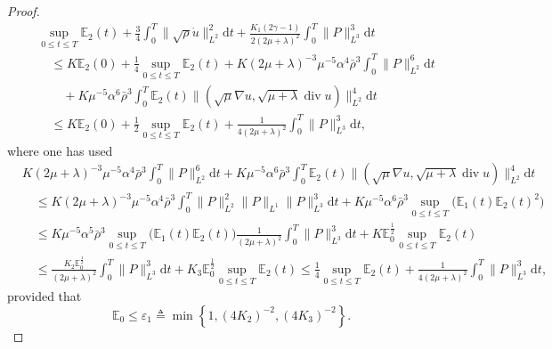 \documentclass[10pt,a4paper]{amsart}
\DeclareMathOperator{\divv}{div}
\begin{document}
\begin{proof}
\begin{align*}
& \sup_{0 \leq t \leq T} \mathbb{E}_2 (t) + \frac{3}{4}\int^T_0 \|\sqrt{\rho} \dot{u}\|_{L^2}^2 \mathrm{d} t + \frac{K_1 \left( 2 \gamma - 1\right)}{2 \left(2 \mu + \lambda \right)^2} \int^T_0 \|P\|_{L^3}^3 \mathrm{d} t\\
& \quad \leq K \mathbb{E}_2 (0) + \frac{1}{4} \sup_{0 \leq t \leq T} \mathbb{E}_2 (t) + K \left( 2 \mu + \lambda \right)^{-3} \mu^{-5} \alpha^4 \bar{\rho}^3 \int^T_0 \|P\|_{L^2}^6 \mathrm{d} t\\
& \qquad + K \mu^{-5} \alpha^6 \bar{\rho}^3 \int^T_0 \mathbb{E}_2 (t) \|(\sqrt{\mu}\nabla u, \sqrt{\mu + \lambda} \divv u)\|_{L^2}^4 \mathrm{d} t\\
& \quad \leq K \mathbb{E}_2 (0) + \frac{1}{2} \sup_{0 \leq t \leq T} \mathbb{E}_2 (t) + \frac{1}{4 \left(2 \mu + \lambda \right)^2} \int^T_0 \|P\|_{L^3}^3 \mathrm{d} t,
\end{align*}
where one has used
\begin{align*}
& K \left( 2 \mu + \lambda \right)^{-3} \mu^{-5} \alpha^4 \bar{\rho}^3 \int^T_0 \|P\|_{L^2}^6 \mathrm{d} t + K \mu^{-5} \alpha^6 \bar{\rho}^3 \int^T_0 \mathbb{E}_2 (t) \|(\sqrt{\mu}\nabla u, \sqrt{\mu + \lambda} \divv u)\|_{L^2}^4 \mathrm{d} t\\
& \quad \leq K \left( 2 \mu + \lambda \right)^{-3} \mu^{-5} \alpha^4 \bar{\rho}^3 \int^T_0 \|P\|_{L^2}^2 \|P\|_{L^1} \|P\|_{L^3}^3 \mathrm{d} t + K \mu^{-5} \alpha^6 \bar{\rho}^3 \sup_{0 \leq t \leq T}\big(\mathbb{E}_1 (t) \mathbb{E}_2(t)^2\big)\\
& \quad  \leq K \mu^{-5} \alpha^5 \bar{\rho}^3 \sup_{0 \leq t \leq T}\big(\mathbb{E}_1(t) \mathbb{E}_2(t)\big)\frac{1}{(2 \mu + \lambda )^2} \int^T_0 \|P\|_{L^3}^3 \mathrm{d} t + K \mathbb{E}_0^{\frac{1}{2}} \sup_{0 \leq t \leq T} \mathbb{E}_2 (t)\\
&  \quad \leq \frac{K_2 \mathbb{E}_0^{\frac{1}{2}}}{(2 \mu + \lambda )^2} \int^T_0 \|P\|_{L^3}^3 \mathrm{d} t + K_3 \mathbb{E}_0^{\frac{1}{2}} \sup_{0 \leq t \leq T} \mathbb{E}_2 (t) \leq \frac{1}{4} \sup_{0 \leq t \leq T} \mathbb{E}_2 (t) + \frac{1}{4 (2 \mu + \lambda )^2} \int^T_0 \|P\|_{L^3}^3 \mathrm{d} t,
\end{align*}
provided that
$$
\mathbb{E}_0 \leq \varepsilon_1 \triangleq \min \left\{1, (4 K_2)^{-2}, (4 K_3)^{-2}\right\}.
$$


\end{proof}
\end{document}
